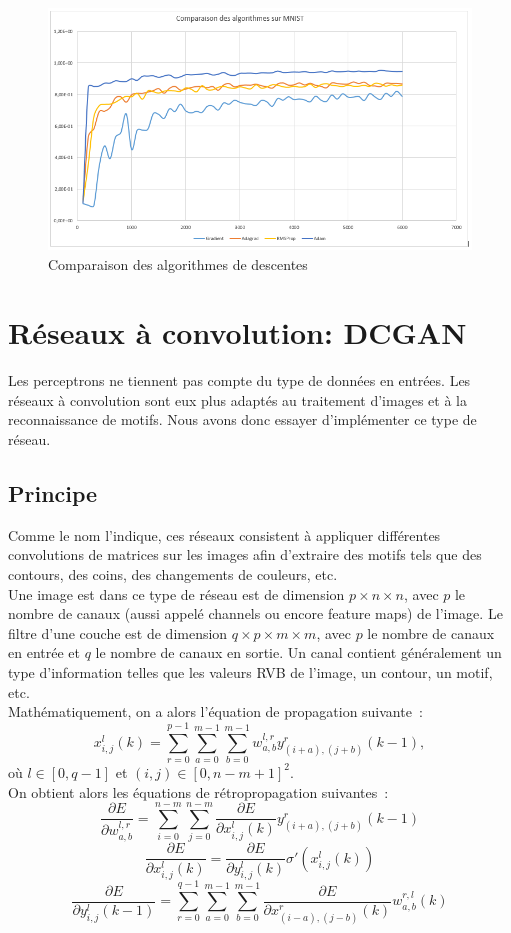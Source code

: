 \begin{figure}[ht!]
  \includegraphics[width=\linewidth]{fig/comparaisonAlgos.png}
  \caption{Comparaison des algorithmes de descentes}
  \label{fig:comp_algos}
\end{figure}

\section{Réseaux à convolution: DCGAN}

Les perceptrons ne tiennent pas compte du type de données en entrées. 
Les réseaux à convolution sont eux plus adaptés au traitement d'images et à la reconnaissance de motifs.
Nous avons donc essayer d'implémenter ce type de réseau.

\subsection{Principe}
Comme le nom l'indique, ces réseaux consistent à appliquer différentes convolutions de matrices sur les images afin d'extraire des motifs tels que des contours, des coins, des changements de couleurs, etc.
\\
Une image est dans ce type de réseau est de dimension $p \times n \times n$, avec $p$ le nombre de canaux (aussi appelé channels ou encore feature maps) de l'image.
Le filtre d'une couche est de dimension $q \times p \times m \times m$, avec $p$ le nombre de canaux en entrée et $q$ le nombre de canaux en sortie.
Un canal contient généralement un type d'information telles que les valeurs RVB de l'image, un contour, un motif, etc.
\\
Mathématiquement, on a alors l'équation de propagation suivante :
\[x^{l}_{i,j}(k) = \sum^{p-1}_{r=0}{\sum^{m-1}_{a=0}{\sum^{m-1}_{b=0}{w_{a,b}^{l,r}y^{r}_{(i+a),(j+b)}(k-1)}}},\]
où $l\in [0, q-1]$ et $(i,j)\in [0, n-m+1]^2$.
\\
On obtient alors les équations de rétropropagation suivantes :
\[\frac{\partial E}{\partial w_{a,b}^{l,r}} = \sum^{n-m}_{i=0}{\sum^{n-m}_{j=0}{\frac{\partial E}{\partial x^{l}_{i,j}(k)}y^{r}_{(i+a),(j+b)}(k-1)}}\]
\[\frac{\partial E}{\partial x_{i,j}^{l}(k)} = \frac{\partial E}{\partial y_{i,j}^{l}(k)}\sigma ' (x^{l}_{i,j}(k))\]
\[\frac{\partial E}{\partial y_{i,j}^{l}(k-1)} = \sum^{q-1}_{r=0}\sum^{m-1}_{a=0}{\sum^{m-1}_{b=0}{\frac{\partial E}{\partial x^{r}_{(i-a),(j-b)}(k)}w^{r,l}_{a,b}(k)}} \]

